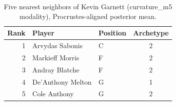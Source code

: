 \begin{table}[htbp]
  \centering\small
  \begin{tabular}{rllc}
    \toprule
    Rank & Player & Position & Archetype \\
    \midrule
    1 & Arvydas Sabonis & C & 2 \\
    2 & Markieff Morris & F & 2 \\
    3 & Andray Blatche & F & 2 \\
    4 & De'Anthony Melton & G & 1 \\
    5 & Cole Anthony & G & 2 \\
    \bottomrule
  \end{tabular}
  \caption{Five nearest neighbors of Kevin Garnett (curvature_m5 modality), Procrustes-aligned posterior mean.}
  \label{tab:Kevin_Garnett_neighbors_curvature_m5}
\end{table}

